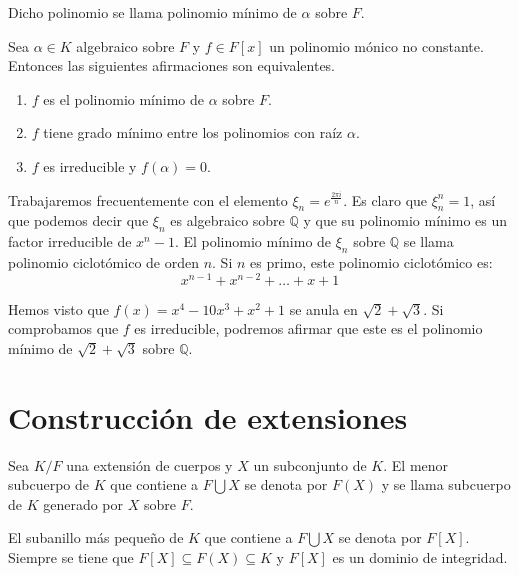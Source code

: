 \begin{definition}
    Dicho polinomio se llama polinomio mínimo de $\alpha$ sobre $F$.
\end{definition}

\begin{proposition}
    Sea $\alpha \in K$ algebraico sobre $F$ y $f \in F[x]$ un polinomio mónico no constante.
    Entonces las siguientes afirmaciones son equivalentes.
    \begin{enumerate}
        \item $f$ es el polinomio mínimo de $\alpha$ sobre $F$.
        \item $f$ tiene grado mínimo entre los polinomios con raíz $\alpha$.
        \item $f$ es irreducible y $f(\alpha) = 0$.
    \end{enumerate}
\end{proposition}

\begin{example}
    Trabajaremos frecuentemente con el elemento $\xi_n = e^{\frac{2\pi i}{n}}$. Es claro que $\xi_n^n = 1$, así que podemos decir que $\xi_n$ es algebraico sobre $\mathbb{Q}$ y que su polinomio mínimo es un factor irreducible de $x^n - 1$.
    El polinomio mínimo de $\xi_n$ sobre $\mathbb{Q}$ se llama polinomio ciclotómico de orden $n$. Si $n$ es primo, este polinomio ciclotómico es:
    $$x^{n-1} + x^{n-2} + \dots + x + 1$$
\end{example}

\begin{example}
    Hemos visto que $f(x) = x^4 - 10x^3 + x^2 + 1$ se anula en $\sqrt{2} + \sqrt{3}$. Si comprobamos que $f$ es irreducible, podremos afirmar que este es el polinomio mínimo de $\sqrt{2} + \sqrt{3}$ sobre $\mathbb{Q}$.
\end{example}

\section{Construcción de extensiones}

\begin{definition}
    Sea $K/F$ una extensión de cuerpos y $X$ un subconjunto de $K$.
    El menor subcuerpo de $K$ que contiene a $F \bigcup X$ se denota por $F(X)$ y se llama subcuerpo de $K$ generado por $X$ sobre $F$.
\end{definition}

\begin{definition}
    El subanillo más pequeño de $K$ que contiene a $F \bigcup X$ se denota por $F[X]$.
    Siempre se tiene que $F[X] \subseteq F(X) \subseteq K$ y $F[X]$ es un dominio de integridad.
\end{definition}

